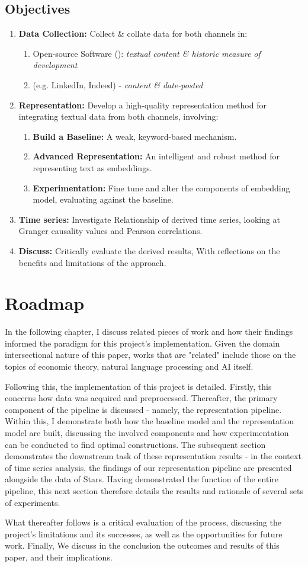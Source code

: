 \subsection{Objectives}
\begin{enumerate}
  \item \textbf{Data Collection:} Collect \& collate data for both channels in:
        \begin{enumerate}
          \item Open-source Software (\gh{}): \emph{textual content \& historic measure of development}
          \item \jobposts{} (e.g. LinkedIn, Indeed) - \emph{content \& date-posted}
        \end{enumerate}
  \item \textbf{Representation:} Develop a high-quality representation method for integrating textual data from both channels, involving:
        \begin{enumerate}
          \item \textbf{Build a Baseline:} A weak, keyword-based mechanism.
          \item \textbf{Advanced Representation:} An intelligent and robust method for representing text as embeddings.
          \item \textbf{Experimentation:} Fine tune and alter the components of embedding model, evaluating against the baseline.
        \end{enumerate}
  \item \textbf{Time series:} Investigate Relationship of derived time series, looking at Granger causality values and Pearson correlations.
  \item \textbf{Discuss:} Critically evaluate the derived results, With reflections on the benefits and limitations of the approach.
\end{enumerate}

\section{Roadmap}

In the following chapter, I discuss related pieces of work and how their findings informed the paradigm for this project's implementation.
Given the domain intersectional nature of this paper, works that are "related" include those on the topics of economic theory, natural language processing and AI itself.

Following this, the implementation of this project is detailed. Firstly, this concerns how data was acquired and preprocessed.
Thereafter, the primary component of the pipeline is discussed - namely, the representation pipeline.
Within this, I demonstrate both how the baseline model and the representation model are built, discussing the involved components and how experimentation can be conducted to find optimal constructions.
The subsequent section demonstrates the downstream task of these representation results - in the context of time series analysis, the findings of our representation pipeline are presented alongside the data of \gh{} Stars.
Having demonstrated the function of the entire pipeline, this next section therefore details the results and rationale of several sets of experiments.

What thereafter follows is a critical evaluation of the process, discussing the project's limitations and its successes, as well as the opportunities for future work.
Finally, We discuss in the conclusion the outcomes and results of this paper, and their implications.
